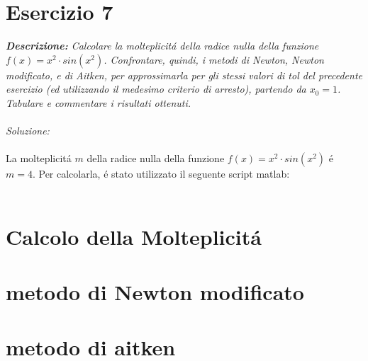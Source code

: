 \section{Esercizio 7}

\textit{\textbf{Descrizione:} Calcolare la molteplicit\'a della radice nulla della funzione $f(x) = x^{2} \cdot sin(x^{2})$. Confrontare, quindi, i metodi di Newton, Newton modificato, e di Aitken, per approssimarla per gli stessi valori di tol del precedente esercizio (ed utilizzando il medesimo criterio di arresto), partendo da $x_{0}=1$. Tabulare e commentare i risultati ottenuti.}\\~\\
\emph{Soluzione:}\\~\\
La molteplicit\'a $m$ della radice nulla della funzione $f(x) = x^{2} \cdot sin(x^{2})$  \'e $m=4$. Per calcolarla, \'e stato utilizzato il seguente script matlab:
\\~\\

\section*{Calcolo della Molteplicit\'a}

\newpage

\section*{metodo di  Newton modificato}

\newpage

\section*{metodo di aitken}

\newpage

